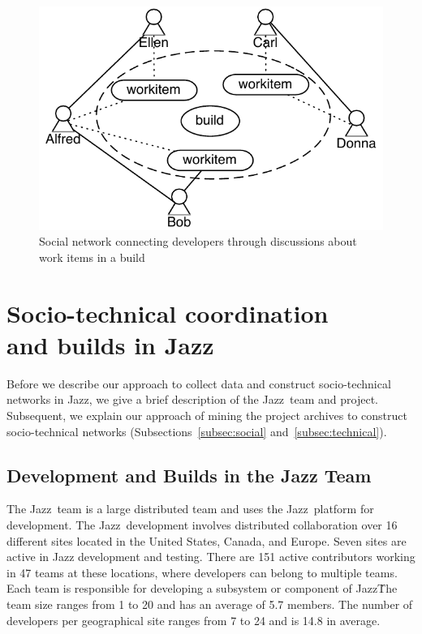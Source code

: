 \documentclass[12pt,oneside]{book}
\newcommand\tm{\texttrademark}
\begin{document}
\begin{figure}[t]
\centering
\includegraphics[width=.9\columnwidth]{figures/buildsn}
\caption{Social network connecting developers through discussions about
work items in a build}
\label{fig:buildsn}
\end{figure}


















\section{Socio-technical coordination\\ and builds in Jazz}
\label{sec:data}
Before we describe our approach to collect data and construct
socio-technical networks in Jazz, we give a brief
description of the Jazz\texttrademark\ team and project. Subsequent,
we explain our approach of mining the project archives to construct
socio-technical networks (Subsections~\ref{subsec:social}
and~\ref{subsec:technical}).

\subsection{Development and Builds in the Jazz Team}
The Jazz\tm\ team is a large distributed team and uses the Jazz\tm\ platform for
development. The Jazz\tm\ development involves distributed collaboration over 16
different sites located in the United States, Canada, and Europe. Seven sites are
active in Jazz development and testing. There are 151 active contributors
working in 47 teams at these locations, where developers can belong to multiple
teams. Each team is responsible for developing a subsystem or component of Jazz\tm\.
The team size ranges from 1 to 20 and has an average of 5.7 members. The number
of developers per geographical site ranges from 7 to 24 and is 14.8 in average.
\end{document}
